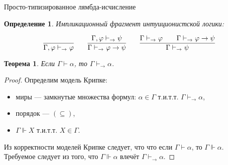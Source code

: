 \documentclass[aspectratio=169]{beamer}
\newtheorem{thm}{Теорема}[section]
\newtheorem{dfn}{Определение}[section]
\begin{document}
\begin{frame}{Просто-типизированное лямбда-исчисление}
\begin{dfn}Импликационный фрагмент интуиционистской логики:

$$\infer{\Gamma,\varphi \vdash_\rightarrow \varphi}{} \quad\quad 
  \infer{\Gamma\vdash_\rightarrow\varphi\rightarrow\psi}{\Gamma,\varphi\vdash_\rightarrow\psi} \quad\quad 
  \infer{\Gamma\vdash_\rightarrow\psi}{\Gamma\vdash_\rightarrow\varphi\quad\quad\Gamma\vdash_\rightarrow\varphi\rightarrow\psi}$$
\end{dfn}

\vspace{-0.3cm}
\begin{thm}Если $\Gamma\vdash\alpha$, то $\Gamma\vdash_\rightarrow\alpha$.\end{thm}
\begin{proof}
Определим модель Крипке: \begin{itemize}
\item миры --- замкнутые множества формул: $\alpha\in\Gamma$ т.и.т.т. $\Gamma\vdash_\rightarrow\alpha$, 
\item порядок --- $(\subseteq)$,
\item $\Gamma\Vdash X$ т.и.т.т. $X\in\Gamma$.
\end{itemize}


Из корректности моделей Крипке следует, что что если $\Gamma\vdash\alpha$, то $\Gamma\Vdash \alpha$.
Требуемое следует из того, что $\Gamma\Vdash \alpha$ влечёт $\Gamma\vdash_\rightarrow\alpha$.
\end{proof}
\end{frame}
\end{document}
